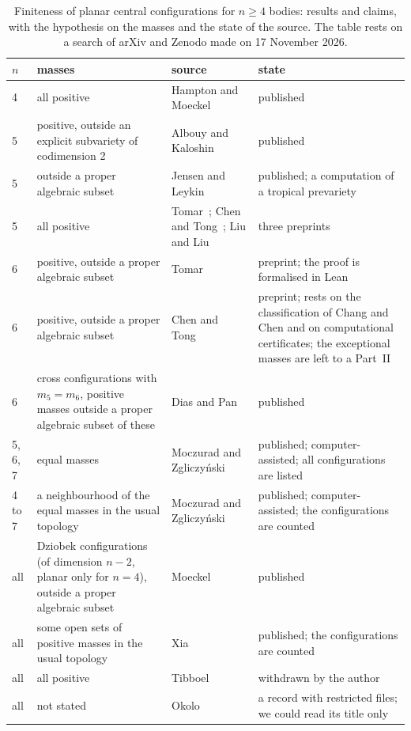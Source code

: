 \documentclass[11pt]{amsart}
\theoremstyle{definition}
\theoremstyle{remark}
\numberwithin{equation}{section}
\begin{document}
\begin{table}[ht]
\caption{Finiteness of planar central configurations for $n \ge 4$ bodies: results and claims, with the
hypothesis on the masses and the state of the source. The table rests on a search of arXiv and Zenodo
made on 17 November 2026.}\label{tab:known}
\small
\begin{tabular}{@{}l>{\raggedright}p{}>{\raggedright}p{}>{\raggedright\arraybackslash}p{}@{}}
\toprule
$n$ & masses & source & state \\
\midrule
4 & all positive & Hampton and Moeckel~\cite{hamptonmoeckel2006} & published \\
5 & positive, outside an explicit subvariety of codimension 2 & Albouy and Kaloshin~\cite{albouykaloshin2012} & published \\
5 & outside a proper algebraic subset & Jensen and Leykin~\cite{jensenleykin2025} & published; a computation of a tropical prevariety \\
5 & all positive & Tomar~\cite{tomar5}; Chen and Tong~\cite{chentong5}; Liu and Liu~\cite{liuliu5} & three preprints \\
6 & positive, outside a proper algebraic subset & Tomar~\cite{tomar6} & preprint; the proof is formalised in Lean \\
6 & positive, outside a proper algebraic subset & Chen and Tong~\cite{chentong6} & preprint; rests on the classification of Chang and Chen and on computational certificates; the exceptional masses are left to a Part~II \\
6 & cross configurations with $m_5 = m_6$, positive masses outside a proper algebraic subset of these & Dias and Pan~\cite{diaspan2020} & published \\
5, 6, 7 & equal masses & Moczurad and Zgliczy\'nski~\cite{moczuradzgliczynski2019} & published; computer-assisted; all configurations are listed \\
4 to 7 & a neighbourhood of the equal masses in the usual topology & Moczurad and Zgliczy\'nski~\cite{moczuradzgliczynski2020} & published; computer-assisted; the configurations are counted \\
all & Dziobek configurations (of dimension $n - 2$, planar only for $n = 4$), outside a proper algebraic subset & Moeckel~\cite{moeckel2001} & published \\
all & some open sets of positive masses in the usual topology & Xia~\cite{xia1991} & published; the configurations are counted \\
all & all positive & Tibboel~\cite{tibboel2013} & withdrawn by the author \\
all & not stated & Okolo~\cite{okolo2026} & a record with restricted files; we could read its title only \\
\bottomrule
\end{tabular}
\end{table}
\end{document}
